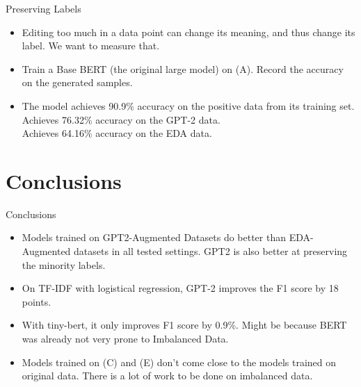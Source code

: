\documentclass{beamer}
\begin{document}
\begin{frame}{Preserving Labels}
\begin{itemize}
\item<1-> Editing too much in a data point can change its meaning, and thus change its label. We want to measure that.

\textbf{}

\item<2-> Train a Base BERT (the original large model) on (A). Record the accuracy on the generated samples.

\textbf{}

\item<3-> The model achieves 90.9\% accuracy on the positive data from its training set. \\
Achieves 76.32\% accuracy on the GPT-2 data. \\
Achieves 64.16\% accuracy on the EDA data.

\end{itemize}
\end{frame}

\section{Conclusions}

\begin{frame}{Conclusions}
\begin{itemize}
\item<1-> Models trained on GPT2-Augmented Datasets do better than EDA-Augmented datasets in all tested settings. GPT2 is also better at preserving the minority labels.

\textbf{}

\item<2-> On TF-IDF with logistical regression, GPT-2 improves the F1 score by 18 points. 

\textbf{}

\item<3-> With tiny-bert, it only improves F1 score by 0.9\%. Might be because BERT was already not very prone to Imbalanced Data. 

\textbf{}

\item<4-> Models trained on (C) and (E) don't come close to the models trained on original data. There is a lot of work to be done on imbalanced data.


\end{itemize}
\end{frame}
\end{document}
